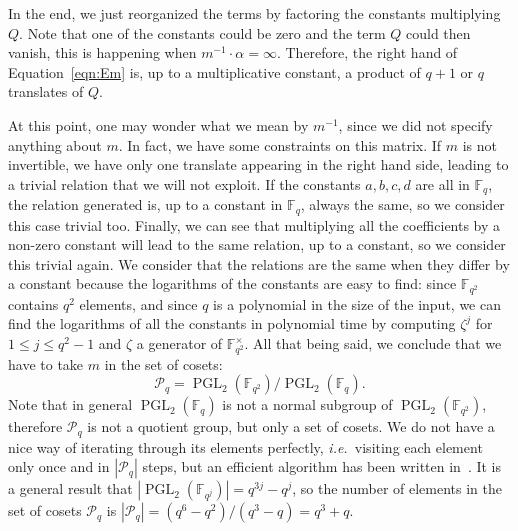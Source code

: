 \documentclass[a4paper,11pt]{article}
\theoremstyle{break}
\theoremstyle{sc}
\theoremstyle{definition}
\theoremstyle{remark}
\DeclareMathOperator{\pgl}{PGL}
\newcommand{\ie}{\emph{i.e.\ }}
\begin{document}
In the end, we just reorganized the terms by factoring the constants multiplying $Q$.
Note that one of the constants could be zero and the term $Q$ could then vanish,
this is happening when $m^{-1}\cdot\alpha=\infty$. Therefore, the right hand of
Equation~\eqref{eqn:Em} is, up to a multiplicative constant, a product of $q+1$ or $q$
translates of $Q$.

At this point, one may wonder what we mean by $m^{-1}$, since we
did not specify anything about $m$. In fact, we have some constraints on this
matrix. If $m$ is not invertible, we have only one translate appearing in the
right hand side, leading to a trivial relation that we will not exploit. If the
constants $a, b, c, d$ are all in $\mathbb{F}_q$, the relation generated is, up
to a constant in $\mathbb{F}_q$, always the same, so we consider this case
trivial too. Finally, we can see that multiplying all the coefficients by a
non-zero constant will lead to the same relation, up to a constant, so we
consider this trivial again. We consider that the relations are the same when
they differ by a constant because the logarithms of the constants are easy to
find: since $\mathbb{F}_{q^2}$ contains $q^2$ elements, and since $q$ is a
polynomial in the size of the input, we can find the logarithms of all the
constants in polynomial time by computing $\zeta^j$ for $1\leq j \leq q^2-1$ and
$\zeta$ a generator of $\mathbb{F}_{q^2}^\times$. All that being said, we conclude that we have to take
$m$ in the set of cosets:
\[
  \mathcal P_q = \pgl_2(\mathbb{F}_{q^2})/\pgl_2(\mathbb{F}_q).
\]
Note that in general $\pgl_2(\mathbb{F}_q)$ is not a normal subgroup of
$\pgl_2(\mathbb{F}_{q^2})$, therefore $\mathcal P_q$ is not a quotient group,
but only a set of cosets. We do not have a nice way of iterating
through its elements perfectly, \ie visiting each element only once and in
$|\mathcal P_q|$ steps, but an efficient algorithm has been written
in~\cite{ZC15}. It is a general result that
$|\pgl_2(\mathbb{F}_{q^j})|=q^{3j}-q^j$, so the number of elements in the set of
cosets $\mathcal P_q$ is $|\mathcal P_q| = (q^6-q^2)/(q^3-q)=q^3+q$.
\end{document}
